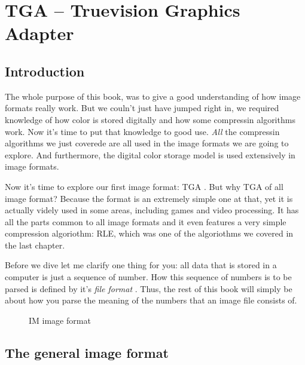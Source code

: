 \begin{comment}
  
\end{comment}

\chapter{TGA -- Truevision Graphics Adapter}
\label{cha:tga}

\begin{refsection}

  \cite{91:_truev_tga_file_format_specif}

  \section{Introduction}
  \label{sec:introduction}

  The whole purpose of this book, was to give a good understanding of
  how image formats really work. But we couln't just have jumped right
  in, we required knowledge of how color is stored digitally and how
  some compressin algorithms work. Now it's time to put that knowledge
  to good use. \textit{All} the compressin algorithms we just coverede
  are all used in the image formats we are going to explore. And
  furthermore, the digital color storage model is used extensively in
  image formats.

  Now it's time to explore our first image format: TGA . But why TGA of
  all image format? Because the format is an extremely simple one at
  that, yet it is actually videly used in some areas, including games
  and video processing. It has all the parts common to all image
  formats and it even features a very simple compression algoriothm:
  RLE, which was one of the algoriothms we covered in the last
  chapter.

  Before we dive let me clarify one thing for you: all data that is
  stored in a computer is just a sequence of number. How this sequence
  of numbers is to be parsed is defined by it's \textit{file format}
  . Thus, the rest of this book will
  simply be about how you parse the meaning of the numbers that an
  image file consists of.

  \begin{figure}[h!]
    \centering

    \caption{IM image format}
    \label{fig:im}
  \end{figure}

  \section{The general image format}
  \label{sec:general-image-format}


\end{refsection}

